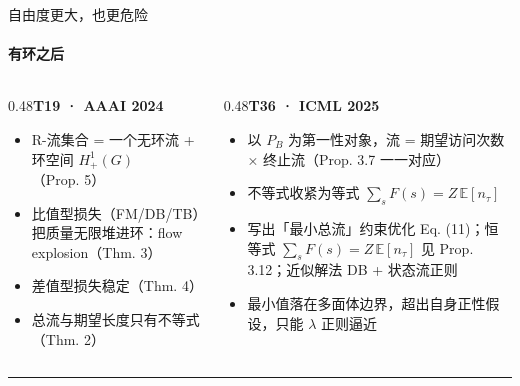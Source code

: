 \documentclass[aspectratio=169,10pt]{beamer}
\newcommand{\pos}[1]{\textcolor{positive}{#1}}
\begin{document}
\begin{frame}{自由度更大，也更危险}\framesubtitle{有环之后}
\begin{columns}[T]
\begin{column}{0.48\textwidth}\textbf{\pos{T19 · AAAI 2024}}\vspace{2pt}
{\footnotesize\begin{itemize}
\item R-流集合 = 一个无环流 + 环空间 $H^1_+(G)$（Prop. 5）
\item 比值型损失（FM/DB/TB）把质量无限堆进环：flow explosion（Thm. 3）
\item 差值型损失稳定（Thm. 4）
\item 总流与期望长度只有不等式（Thm. 2）
\end{itemize}}\end{column}
\hfill
\begin{column}{0.48\textwidth}\textbf{\pos{T36 · ICML 2025}}\vspace{2pt}
{\footnotesize\begin{itemize}
\item 以 $P_B$ 为第一性对象，流 = 期望访问次数 × 终止流（Prop. 3.7 一一对应）
\item 不等式收紧为等式 $\sum_s F(s)=Z\,\mathbb E[n_\tau]$
\item 写出「最小总流」约束优化 Eq. (11)；恒等式 $\sum_s F(s)=Z\,\mathbb E[n_\tau]$ 见 Prop. 3.12；近似解法 DB + 状态流正则
\item 最小值落在多面体边界，超出自身正性假设，只能 $\lambda$ 正则逼近
\end{itemize}}\end{column}
\end{columns}
\vfill\hrule\vspace{2pt}{\footnotesize\textcolor{neutral}{易误读：T19「极限流无环」≠「解唯一」。DAG 上环空间为零时 R-流照样不唯一；真正选出一个点的是 T36 的线性目标。}}
\end{frame}
\end{document}
